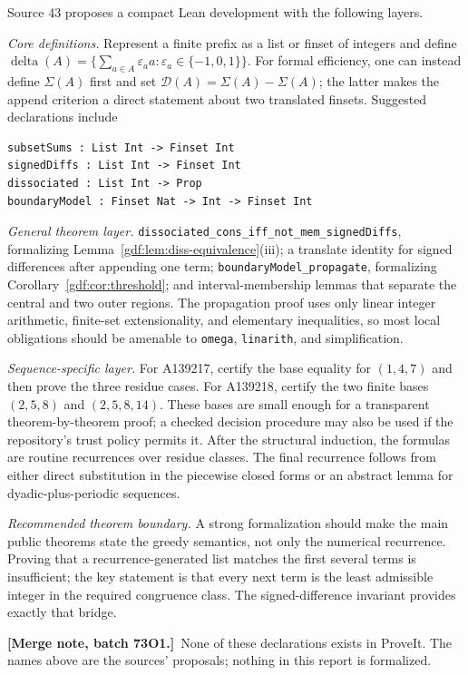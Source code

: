 \documentclass[11pt,a4paper]{article}
\numberwithin{equation}{section}
\theoremstyle{definition}
\theoremstyle{remark}
\theoremstyle{plain}
\newcommand{\cD}{\mathcal D}
\newcommand{\mergenote}[1]{\par\smallskip\noindent\textbf{[Merge note, batch 73O1.]}\ #1\par\smallskip}
\begin{document}
Source 43 proposes a compact Lean development with the following layers.

\emph{Core definitions.} Represent a finite prefix as a list or finset of
integers and define $\operatorname{delta}(A)=\{\sum_{a\in A}\varepsilon_a
a:\varepsilon_a\in\{-1,0,1\}\}$.  For formal efficiency, one can instead
define $\Sigma(A)$ first and set $\cD(A)=\Sigma(A)-\Sigma(A)$; the latter
makes the append criterion a direct statement about two translated finsets.
Suggested declarations include
\begin{verbatim}
subsetSums : List Int -> Finset Int
signedDiffs : List Int -> Finset Int
dissociated : List Int -> Prop
boundaryModel : Finset Nat -> Int -> Finset Int
\end{verbatim}

\emph{General theorem layer.} \nolinkurl{dissociated_cons_iff_not_mem_signedDiffs},
formalizing Lemma~\ref{gdf:lem:diss-equivalence}(iii); a translate identity
for signed differences after appending one term;
\texttt{boundaryModel\_propagate}, formalizing
Corollary~\ref{gdf:cor:threshold}; and interval-membership lemmas that
separate the central and two outer regions.  The propagation proof uses only
linear integer arithmetic, finite-set extensionality, and elementary
inequalities, so most local obligations should be amenable to
\texttt{omega}, \texttt{linarith}, and simplification.

\emph{Sequence-specific layer.} For A139217, certify the base equality for
$(1,4,7)$ and then prove the three residue cases.  For A139218, certify the
two finite bases $(2,5,8)$ and $(2,5,8,14)$.  These bases are small enough for
a transparent theorem-by-theorem proof; a checked decision procedure may also
be used if the repository's trust policy permits it.  After the structural
induction, the formulas are routine recurrences over residue classes.  The
final recurrence follows from either direct substitution in the piecewise
closed forms or an abstract lemma for dyadic-plus-periodic sequences.

\emph{Recommended theorem boundary.} A strong formalization should make the
main public theorems state the greedy semantics, not only the numerical
recurrence.  Proving that a recurrence-generated list matches the first
several terms is insufficient; the key statement is that every next term is
the least admissible integer in the required congruence class.  The
signed-difference invariant provides exactly that bridge.

\mergenote{None of these declarations exists in ProveIt.  The names above are
the sources' proposals; nothing in this report is formalized.}
\end{document}
